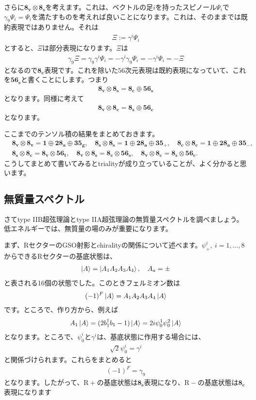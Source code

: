 \documentclass[report,paper=a4, fontsize=12pt, line_length=16cm, number_of_lines=34,dvipdfmx]{jlreq}
\numberwithin{equation}{chapter}
\numberwithin{equation}{section}
\newcommand{\Rp}{\mathrm{R}+}
\newcommand{\Rm}{\mathrm{R}-}
\newcommand{\triv}{\mathbf{1}}
\newcommand{\etv}{\mathbf{8_v}}
\newcommand{\ets}{\mathbf{8_s}}
\newcommand{\etc}{\mathbf{8_c}}
\newcommand{\tweta}{\mathbf{28_{a}}}
\newcommand{\thfvg}{\mathbf{35_{g}}}
\newcommand{\thfvp}{\mathbf{35}_{+}}
\newcommand{\thfvm}{\mathbf{35}_{-}}
\newcommand{\fsxt}{\mathbf{56_t}}
\newcommand{\fsxs}{\mathbf{56_s}}
\newcommand{\fsxc}{\mathbf{56_c}}
\begin{document}
さらに$\etv\otimes \ets$を考えます。これは、ベクトルの足$i$を持ったスピノール$\Psi_i$で$\gamma_9 \Psi_i=\Psi_i$を満たすものを考えれば良いことになります。これは、そのままでは既約表現ではありません。それは
\begin{align}
  \Xi:=\gamma^{i}\Psi_i
\end{align}
とすると、$\Xi$は部分表現になります。$\Xi$は
\begin{align}
  \gamma_9\Xi
  =\gamma_9\gamma^{i}\Psi_i
  =-\gamma^{i}\gamma_9\Psi_i
  =-\gamma^{i}\Psi_i
  =-\Xi
\end{align}
となるので$\etc$表現です。これを除いた$56$次元表現は既約表現になっていて、これを$\fsxs$と書くことにします。つまり
\begin{align}
  \etv\otimes \ets=\etc\oplus\fsxs
\end{align}
となります。同様に考えて
\begin{align}
  \etv\otimes \etc=\ets\oplus\fsxc
\end{align}
となります。

ここまでのテンソル積の結果をまとめておきます。
\begin{align}
  &\etv\otimes\etv=\triv \oplus \tweta\oplus \thfvg,\quad
  \ets\otimes\ets=\triv \oplus \tweta\oplus \thfvp,\quad
  \etc\otimes\etc=\triv \oplus \tweta\oplus \thfvm,\nonumber\\
  &\ets\otimes \etc=\etv\otimes\fsxt,\quad
  \etv\otimes \ets=\etc\otimes\fsxs,\quad
  \etv\otimes \etc=\ets\otimes\fsxc.
\end{align}
こうしてまとめて書いてみるとtrialityが成り立っていることが、よく分かると思います。

\subsection{無質量スペクトル}
さてtype IIB超弦理論とtype IIA超弦理論の無質量スペクトルを調べましょう。低エネルギーでは、無質量の場のみが重要になります。

まず、RセクターのGSO射影とchiralityの関係について述べます。$\psi^{i}_{+},\ i=1,\dots,8$からできるRセクターの基底状態は、
\begin{align}
  \ket{A}=\ket{A_1A_2A_3A_4},\quad
  A_a=\pm
\end{align}
と表される16個の状態でした。このときフェルミオン数は
\begin{align}
  (-1)^{F}\ket{A}=A_1A_2A_3A_4\ket{A}
\end{align}
です。ところで、作り方から、例えば
\begin{align}
  A_1\ket{A}=(2b_1^\dag b_1-1)\ket{A}=2i\psi^{1}_{0}\psi^{2}_{0}\ket{A}
\end{align}
となります。ところで、$\psi_0^{i}$と$\gamma^{i}$は、基底状態に作用する場合には、
\begin{align}
  \sqrt{2}\psi_{0}^{i}=\gamma^{i}
\end{align}
と関係づけられます。これらをまとめると
\begin{align}
  (-1)^{F}=\gamma_9
\end{align}
となります。したがって、$\Rp$の基底状態は$\ets$表現になり、$\Rm$の基底状態は$\etc$表現になります
\end{document}
